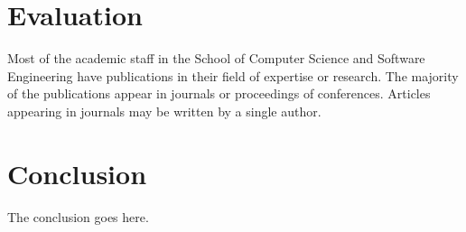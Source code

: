 \documentclass[conference]{IEEEtran}
\begin{document}
\section{Evaluation}

Most of the academic staff in the School of Computer Science and Software Engineering have publications in their field of expertise or research. 
The majority of the publications appear in journals or proceedings of conferences. 
Articles appearing in journals may be written by a single author.

\cite{YARN}
\cite{TwitterHeronBlog}
\cite{InfoQGameChanger}
\cite{ElasticScalingStreamProcessing}
\cite{OnlyOneLook}
\cite{TwitterHeron}
\cite{The8Requirements}
\cite{StormTwitter}
\cite{ScalableDistributedStreamProcessing}


\section{Conclusion}

The conclusion goes here.




\end{document}
